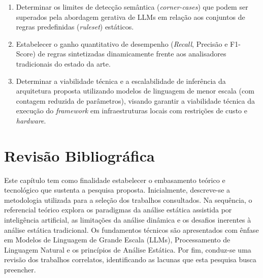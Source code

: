\documentclass[
    12pt,                %
    openright,           %
    oneside,             %
    a4paper,             %
    english,             %
    brazil               %
]{abntex2}
\begin{document}
\begin{enumerate}
  \item Determinar os limites de detecção semântica (\textit{corner-cases}) que podem ser superados pela abordagem gerativa de LLMs em relação aos conjuntos de regras predefinidas (\textit{ruleset}) estáticos.
  \item Estabelecer o ganho quantitativo de desempenho (\textit{Recall}, Precisão e F1-Score) de regras sintetizadas dinamicamente frente aos analisadores tradicionais do estado da arte.
  \item Determinar a viabilidade técnica e a escalabilidade de inferência da arquitetura proposta utilizando modelos de linguagem de menor escala (com contagem reduzida de parâmetros), visando garantir a viabilidade técnica da execução do \textit{framework} em infraestruturas locais com restrições de custo e \textit{hardware}.
\end{enumerate}

\chapter{Revisão Bibliográfica}
\label{cap:revisao}
\par
Este capítulo tem como finalidade estabelecer o embasamento teórico e tecnológico que sustenta a pesquisa proposta.
Inicialmente, descreve-se a metodologia utilizada para a seleção dos trabalhos consultados. Na sequência, o referencial teórico explora os paradigmas da análise estática assistida por inteligência artificial, as limitações da análise dinâmica e os desafios inerentes à análise estática tradicional. 
Os fundamentos técnicos são apresentados com ênfase em Modelos de Linguagem de Grande Escala (LLMs), Processamento de Linguagem Natural e os princípios de Análise Estática. 
Por fim, conduz-se uma revisão dos trabalhos correlatos, identificando as lacunas que esta pesquisa busca preencher.
\end{document}
